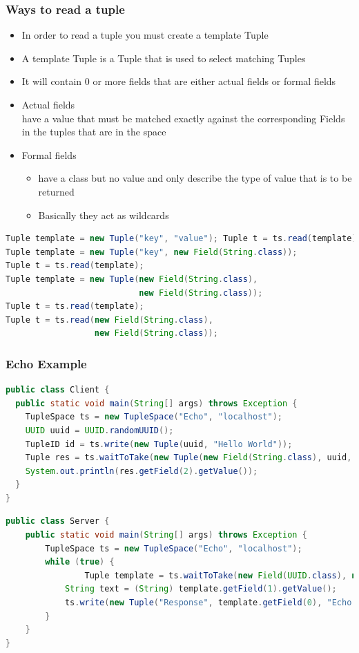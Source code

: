 \documentclass[10pt]{article}
\begin{document}
\subsubsection{Ways to read a tuple}
\begin{itemize}
	\item  In order to read a tuple you must create a template Tuple
	\item A template Tuple is a Tuple that is used to select matching Tuples
	\item It will contain 0 or more fields that are either actual fields or formal fields
	\item Actual fields	\\
		have a value that must be matched exactly against the corresponding Fields in the tuples that are in the space
	\item Formal fields
		\begin{itemize}
			\item have a class but no value and only describe the type of value that is to be returned
			\item Basically they act as wildcards
		\end{itemize}
\end{itemize}
\begin{lstlisting}[language=Java, caption=Ways to read a tuple, style=JavaStyle]
Tuple template = new Tuple("key", "value"); Tuple t = ts.read(template);
Tuple template = new Tuple("key", new Field(String.class));
Tuple t = ts.read(template);
Tuple template = new Tuple(new Field(String.class),
                           new Field(String.class));
Tuple t = ts.read(template);
Tuple t = ts.read(new Field(String.class),
                  new Field(String.class));
\end{lstlisting}
\subsubsection{Echo Example}
\begin{lstlisting}[language=Java, caption=Echo Client, style=JavaStyle]
public class Client {
  public static void main(String[] args) throws Exception {
    TupleSpace ts = new TupleSpace("Echo", "localhost");
    UUID uuid = UUID.randomUUID();
    TupleID id = ts.write(new Tuple(uuid, "Hello World"));
    Tuple res = ts.waitToTake(new Tuple(new Field(String.class), uuid, new Field(String.class)));
    System.out.println(res.getField(2).getValue());
  }
}
\end{lstlisting}
\begin{lstlisting}[language=Java, caption=Echo Server, style=JavaStyle]
public class Server {
	public static void main(String[] args) throws Exception {
		TupleSpace ts = new TupleSpace("Echo", "localhost");
		while (true) {
    			Tuple template = ts.waitToTake(new Field(UUID.class), new Field(String.class));
			String text = (String) template.getField(1).getValue(); 
			ts.write(new Tuple("Response", template.getField(0), "Echo: " + text));
		}
	}
}
\end{lstlisting}
\end{document}
